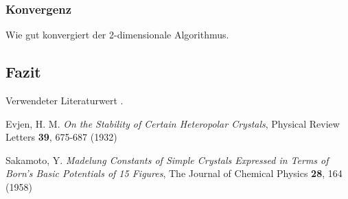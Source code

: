 \documentclass[10pt,a4paper]{article}
\begin{document}
\subsubsection{Konvergenz}

Wie gut konvergiert der 2-dimensionale Algorithmus.

\subsection{Fazit}

Verwendeter Literaturwert  .


\begin{thebibliography}{9}

Evjen, H. M.
\emph{On the Stability of Certain Heteropolar Crystals},
Physical Review Letters \textbf{39},
675-687 (1932)

Sakamoto, Y.
\emph{Madelung Constants of Simple Crystals Expressed in Terms of Born's Basic
Potentials of 15 Figures},
The Journal of Chemical Physics \textbf{28},
164 (1958)

\end{thebibliography}
\end{document}
